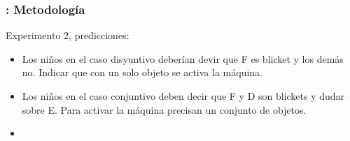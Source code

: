 \begin{frame}[fragile]
  \frametitle{\shortt: Metodología}

Experimento 2, predicciones:

\begin{itemize}
\item Los niños en el caso disyuntivo deberían devir que F es blicket y los demás no. Indicar que con un solo objeto se activa la máquina.
\item Los niños en el caso conjuntivo deben decir que F y D son blickets y dudar sobre E. Para activar la máquina precisan un conjunto de objetos.
\item 
\end{itemize}


\end{frame}